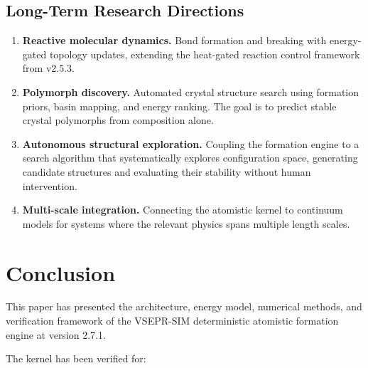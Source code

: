 \documentclass[11pt,twoside]{article}
\begin{document}
\subsection{Long-Term Research Directions}

\begin{enumerate}
  \item \textbf{Reactive molecular dynamics.} Bond formation and breaking with energy-gated topology updates, extending the heat-gated reaction control framework from v2.5.3.

  \item \textbf{Polymorph discovery.} Automated crystal structure search using formation priors, basin mapping, and energy ranking. The goal is to predict stable crystal polymorphs from composition alone.

  \item \textbf{Autonomous structural exploration.} Coupling the formation engine to a search algorithm that systematically explores configuration space, generating candidate structures and evaluating their stability without human intervention.

  \item \textbf{Multi-scale integration.} Connecting the atomistic kernel to continuum models for systems where the relevant physics spans multiple length scales.
\end{enumerate}


\section{Conclusion}
\label{sec:conclusion}

This paper has presented the architecture, energy model, numerical methods, and verification framework of the VSEPR-SIM deterministic atomistic formation engine at version 2.7.1.

The kernel has been verified for:
\end{document}
